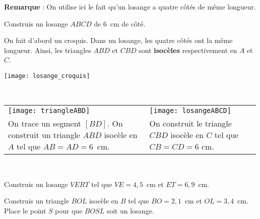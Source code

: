 \begin{methode*1}
 
\vspace{0.8em}
\textcolor{H1}{\textbf{Remarque}} : On utilise ici le fait qu'un losange a quatre côtés de même longueur.

\begin{exemple*1}
Construis un losange $ABCD$ de 6 cm de côté.\\[1em]
\begin{minipage}[c]{0.7\linewidth}
On fait d'abord un croquis. Dans un losange, les quatre côtés ont la même longueur. Ainsi, les triangles $ABD$ et $CBD$ sont \textbf{isocèles} respectivement en $A$ et $C$.
 \end{minipage} \hfill%
 \begin{minipage}[c]{0.24\linewidth}
  \texttt{[image: losange\_croquis]}
  \end{minipage} \\
  
\begin{tabularx}{\textwidth}{X|X}
 \qquad \texttt{[image: triangleABD]} & \texttt{[image: losangeABCD]} \\ 
 On trace un segment $[BD]$. On construit un triangle $ABD$ isocèle en $A$ tel que $AB = AD = 6$ cm. & On construit le triangle $CBD$ isocèle en $C$ tel que $CB = CD = 6$ cm. \\
\end{tabularx} \\

 \end{exemple*1}

\exercice
Construis un losange $VERT$ tel que $VE = 4,5$ cm et $ET = 6,9$ cm.

\vspace{3.5cm}

\exercice
Construis un triangle $BOL$ isocèle en $B$ tel que $BO = 2,1$ cm et $OL = 3,4$ cm. Place le point $S$ pour que $BOSL$ soit un losange.

\end{methode*1}


